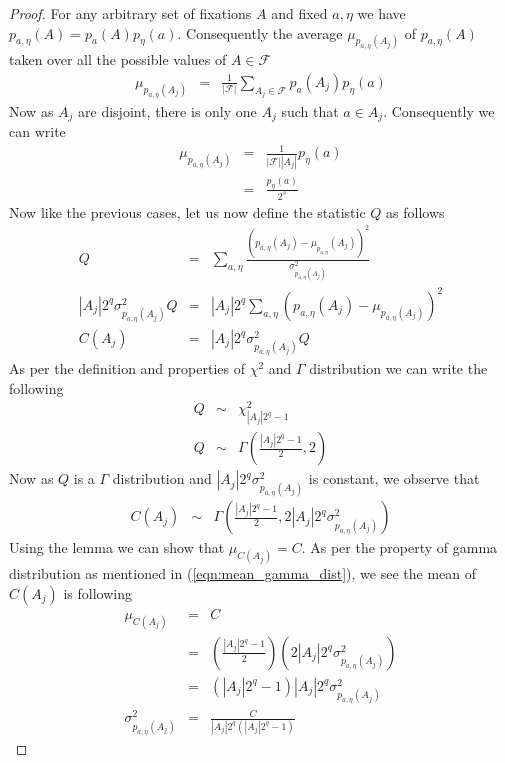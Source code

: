 \begin{proof}
For any arbitrary set of fixations $A$ and fixed $a,\eta$ we have $p_{a,\eta}(A) = p_{a}(A)p_{\eta}(a)$. Consequently the average $\mu_{p_{a,\eta}(A_j)}$ of $p_{a,\eta}(A)$ taken over all the possible values of $A \in \mathcal{F}$  
\begin{eqnarray*}
\mu_{p_{a,\eta}(A_j)} &=& \frac{1}{|\mathcal{F}|} \displaystyle\sum_{A_j \in \mathcal{F}}p_{a}(A_j)p_{\eta}(a)
\end{eqnarray*}
Now as $A_j$ are disjoint, there is only one $A_j$ such that $a \in A_j$. Consequently we can write 
\begin{eqnarray*}
\mu_{p_{a,\eta}(A_j)} &=& \frac{1}{|\mathcal{F}||A_j|}p_{\eta}(a)\\
&=& \frac{p_{\eta}(a)}{2^s}
\end{eqnarray*}
Now like the previous cases, let us now define the statistic $Q$ as follows
\begin{eqnarray*}
Q &=& \displaystyle\sum_{a,\eta}\frac{\left(p_{a,\eta}(A_j)-\mu_{p_{a,\eta}}(A_j)\right)^2}{\sigma^2_{p_{a,\eta}(A_j)}}\\
|A_j|2^q\sigma^2_{p_{a,\eta}(A_j)}Q &=& |A_j|2^q\displaystyle\sum_{a,\eta}\left(p_{a,\eta}(A_j) - \mu_{p_{a,\eta}(A_j)}\right)^2\\
C(A_j) &=& |A_j|2^q\sigma^2_{p_{a,\eta}(A_j)}Q
\end{eqnarray*}
As per the definition and properties of $\chi^2$ and $\Gamma$ distribution we can write the following
\begin{eqnarray*}
Q &\sim & \chi^2_{|A_j|2^q-1}\\
Q &\sim & \Gamma\left(\frac{|A_j|2^q - 1}{2},2\right)
\end{eqnarray*}Now as $Q$ is a $\Gamma$ distribution and $|A_j|2^q\sigma^2_{p_{a,\eta}(A_j)}$ is constant, we observe that 
\begin{eqnarray*}
C(A_j) &\sim & \Gamma\left(\frac{|A_j|2^q-1}{2},2|A_j|2^q\sigma^2_{p_{a,\eta}(A_j)}\right)
\end{eqnarray*}
Using the lemma we can show that $\mu_{C(A_j)} = C$. As per the property of gamma distribution as mentioned in (\ref{eqn:mean_gamma_dist}), we see the mean of $C(A_j)$ is following
\begin{eqnarray*}
\mu_{C(A_j)} &=& C\\
&=& (\frac{|A_j|2^q-1}{2})\left(2|A_j|2^q\sigma^2_{p_{a,\eta}(A_j)}\right)\\
&=& (|A_j|2^q-1)|A_j|2^q\sigma^2_{p_{a,\eta}(A_j)}\\
\sigma^2_{p_{a,\eta}(A_j)} &=& \frac{C}{|A_j|2^{q}(|A_j|2^q-1)} 
\end{eqnarray*} 
\end{proof}
